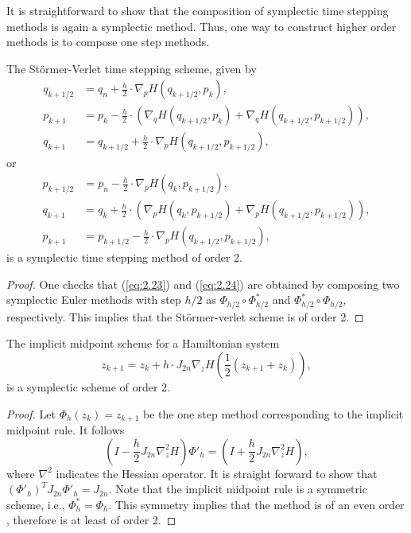 It is straightforward to show that the composition of symplectic time stepping methods is again a symplectic method. Thus, one way to construct higher order methods is to compose one step methods.
\begin{theorem}
The St\"ormer-Verlet time stepping scheme, given by
\begin{equation} \label{eq:2.23}
\begin{aligned}
	q_{k+1/2} &= q_n + \frac h 2 \cdot \nabla_pH(q_{k+1/2},p_k), \\
	p_{k+1} &= p_k - \frac h 2\cdot (\nabla_qH(q_{k+1/2},p_k) + \nabla_qH(q_{k+1/2},p_{k+1/2}) ), \\
	q_{k+1} &= q_{k+1/2} + \frac h 2 \cdot \nabla_pH(q_{k+1/2},p_{k+1/2}),
\end{aligned}
\end{equation}
or 
\begin{equation} \label{eq:2.24}
\begin{aligned}
	p_{k+1/2} &= p_n - \frac h 2 \cdot \nabla_pH(q_k,p_{k+1/2}), \\
	q_{k+1} &= q_k + \frac h 2\cdot (\nabla_pH(q_k,p_{k+1/2}) + \nabla_pH(q_{k+1/2},p_{k+1/2}) ), \\
	p_{k+1} &= p_{k+1/2} - \frac h 2 \cdot \nabla_pH(q_{k+1/2},p_{k+1/2}),
\end{aligned}
\end{equation}
is a symplectic time stepping method of order 2.
\end{theorem}
\begin{proof}
One checks that (\ref{eq:2.23}) and (\ref{eq:2.24}) are obtained by composing two symplectic Euler methods with step $h/2$ as $\Phi_{h/2}\circ \Phi^*_{h/2}$ and $\Phi^*_{h/2}\circ \Phi_{h/2}$, respectively. This implies that the St\"ormer-verlet scheme is of order 2.
\end{proof}
\begin{theorem}
The implicit midpoint scheme for a Hamiltonian system
\begin{equation} \label{eq:2.25}
	z_{k+1} = z_k + h \cdot J_{2n} \nabla_z H( \frac{1}{2}(z_{k+1} + z_k) ),
\end{equation}
is a symplectic scheme of order 2.
\end{theorem}
\begin{proof}
Let $\Phi_h(z_k) = z_{k+1}$ be the one step method corresponding to the implicit midpoint rule. It follows 
\begin{equation*}
	(I - \frac h 2 J_{2n} \nabla^2_z H) \Phi'_h = (I + \frac{h}{2} J_{2n} \nabla^2_z H),
\end{equation*}
where $\nabla^2$ indicates the Hessian operator. It is straight forward to show that $(\Phi'_h)^T J_{2n} \Phi'_h = J_{2n} $. Note that the implicit midpoint rule is a symmetric scheme, i.e., $\Phi^*_h = \Phi_h$. This symmetry implies that the method is of an even order \cite{hairer2006geometric}, therefore is at least of order 2.
\end{proof}

